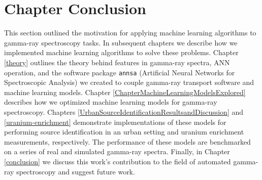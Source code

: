 
\section{Chapter Conclusion}

This section outlined the motivation for applying machine learning algorithms to gamma-ray spectroscopy tasks. In subsequent chapters we describe how we implemented machine learning algorithms to solve these problems. Chapter \ref{theory} outlines the theory behind features in gamma-ray spectra, ANN operation, and the software package \verb|annsa| (Artificial Neural Networks for Spectroscopic Analysis) \cite{annsa} we created to couple gamma-ray transport software and machine learning models. Chapter \ref{ChapterMachineLearningModelsExplored} describes how we optimized machine learning models for gamma-ray spectroscopy. Chapters \ref{UrbanSourceIdentificationResultsandDiscussion} and \ref{uranium-enrichment} demonstrate implementations of these models for performing source identification in an urban setting and uranium enrichment measurements, respectively. The performance of these models are benchmarked on a series of real and simulated gamma-ray spectra. Finally, in Chapter \ref{conclusion} we discuss this work's contribution to the field of automated gamma-ray spectroscopy and suggest future work.

